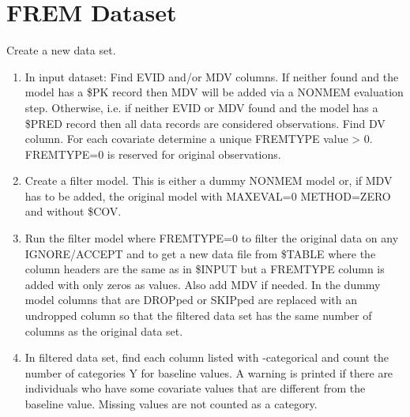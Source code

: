 \section{FREM Dataset}
Create a new data set.
\begin{enumerate}
	\item In input dataset: Find EVID and/or MDV columns. If neither found and the model
    has a \$PK record then MDV will be added via a NONMEM evaluation step.
    Otherwise, i.e. if neither EVID or MDV found and the model
    has a \$PRED record then all data records are considered observations. Find DV column.
    For each covariate  determine a unique %
    FREMTYPE value %
    > 0.
    FREMTYPE=0 is reserved for original observations.
    \item Create a filter model. This is either a dummy NONMEM model or, if MDV has to be added,
    the original model with MAXEVAL=0 METHOD=ZERO and without \$COV.
	\item Run the filter model where FREMTYPE=0 to filter the original data on any IGNORE/ACCEPT and to get a new data file
    from \$TABLE where the column headers are the same as in \$INPUT but a FREMTYPE column is added with only zeros as values.
    Also add MDV if needed. In the dummy model columns that are DROPped or SKIPped are replaced with an undropped column so that the filtered data set has the same number of columns as the original data set.
    \item In filtered data set,
    find each column listed with -categorical and count the number of categories Y for baseline values.
    A warning is printed if there are individuals who have some covariate values that are different from the
    baseline value. Missing values are not counted as a category.


\end{enumerate}
